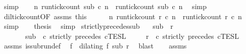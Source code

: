 \begin{isabellebody}
\ simp\isanewline
\ \ \isamarkupfalse%
\ {\isacartoucheopen}{\isasymforall}n{\isachardot}\ {\isacharparenleft}run{\isacharunderscore}tick{\isacharunderscore}count\ sub\ c\ n{\isacharparenright}\ {\isasymle}\ {\isacharparenleft}run{\isacharunderscore}tick{\isacharunderscore}count\ sub\ c\ n{\isacharparenright}{\isacartoucheclose}\ \isamarkupfalse%
\ simp\isanewline
\ \ \isamarkupfalse%
\ dil{\isacharunderscore}tick{\isacharunderscore}count{\isacharbrackleft}OF\ assms{\isacharparenleft}{}{\isacharparenright}\ this{\isacharbrackright}\isanewline
\ \ \ \ \isamarkupfalse%
\ {\isacartoucheopen}{\isasymforall}n{\isachardot}\ {\isacharparenleft}run{\isacharunderscore}tick{\isacharunderscore}count\ r\ c\ n{\isacharparenright}\ {\isasymle}\ {\isacharparenleft}run{\isacharunderscore}tick{\isacharunderscore}count\ r\ c\ n{\isacharparenright}{\isacartoucheclose}\ \isamarkupfalse%
\ simp\isanewline
\ \ \isamarkupfalse%
\ {\isacharquery}thesis\ \isamarkupfalse%
\ simp\isanewline
{}\isamarkupfalse%
%
\endisatagproof
{\isafoldproof}%
%
\isadelimproof
\isanewline
%
\endisadelimproof
\isanewline
{}\isamarkupfalse%
\ strictly{\isacharunderscore}precedes{\isacharunderscore}sub{\isacharcolon}\isanewline
\ \ \ {\isacartoucheopen}sub\ {\isasymlless}\ r{\isacartoucheclose}\isanewline
\ \ \ \ \ \ \ {\isacartoucheopen}sub\ {\isasymin}\ {\isasymlbrakk}c\ strictly\ precedes\ c\isactrlsub T\isactrlsub E\isactrlsub S\isactrlsub L{\isacartoucheclose}\isanewline
\ \ \ \ \ {\isacartoucheopen}r\ {\isasymin}\ {\isasymlbrakk}c\ strictly\ precedes\ c\isactrlsub T\isactrlsub E\isactrlsub S\isactrlsub L{\isacartoucheclose}\isanewline
%
\isadelimproof
%
\endisadelimproof
%
\isatagproof
{}\isamarkupfalse%
\ {\isacharminus}\isanewline
\ \ \isamarkupfalse%
\ assms{\isacharparenleft}{}{\isacharparenright}\ is{\isacharunderscore}subrun{\isacharunderscore}def\ \isamarkupfalse%
\ f\ \ {\isacharasterisk}{\isacharcolon}{\isacartoucheopen}dilating\ f\ sub\ r{\isacartoucheclose}\ \isamarkupfalse%
\ blast\isanewline
\ \ \isamarkupfalse%
\ assms{\isacharparenleft}{}{\isacharparenright}\ \isamarkupfalse%

\end{isabellebody}

